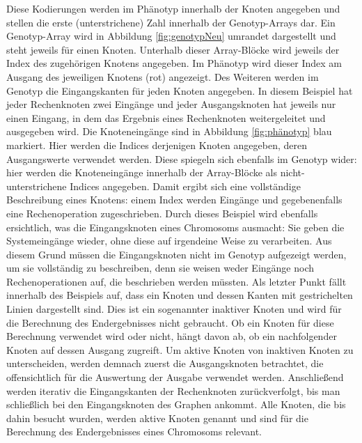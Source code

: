 Diese Kodierungen werden im Phänotyp innerhalb der Knoten angegeben und stellen die erste (unterstrichene) Zahl innerhalb der Genotyp-Arrays dar.
Ein Genotyp-Array wird in Abbildung \ref{fig:genotypNeu} umrandet dargestellt und steht jeweils für einen Knoten.
Unterhalb dieser Array-Blöcke wird jeweils der Index des zugehörigen Knotens angegeben.
Im Phänotyp wird dieser Index am Ausgang des jeweiligen Knotens (rot) angezeigt.\newline
Des Weiteren werden im Genotyp die Eingangskanten für jeden Knoten angegeben. 
In diesem Beispiel hat jeder Rechenknoten zwei Eingänge und jeder Ausgangsknoten hat jeweils nur einen Eingang, in dem das Ergebnis eines Rechenknoten weitergeleitet und ausgegeben wird.
Die Knoteneingänge sind in Abbildung \ref{fig:phänotyp} blau markiert.
Hier werden die Indices derjenigen Knoten angegeben, deren Ausgangswerte verwendet werden.
Diese spiegeln sich ebenfalls im Genotyp wider: hier werden die Knoteneingänge innerhalb der Array-Blöcke als nicht-unterstrichene Indices angegeben.
Damit ergibt sich eine vollständige Beschreibung eines Knotens: einem Index werden Eingänge und gegebenenfalls eine Rechenoperation zugeschrieben.\newline
Durch dieses Beispiel wird ebenfalls ersichtlich, was die Eingangsknoten eines Chromosoms ausmacht:
Sie geben die Systemeingänge wieder, ohne diese auf irgendeine Weise zu verarbeiten.
Aus diesem Grund müssen die Eingangsknoten nicht im Genotyp aufgezeigt werden, um sie vollständig zu beschreiben, denn sie weisen weder Eingänge noch Rechenoperationen auf, die beschrieben werden müssten.\newline
Als letzter Punkt fällt innerhalb des Beispiels auf, dass ein Knoten und dessen Kanten mit gestrichelten Linien dargestellt sind.
Dies ist ein sogenannter inaktiver Knoten und wird für die Berechnung des Endergebnisses nicht gebraucht.
Ob ein Knoten für diese Berechnung verwendet wird oder nicht, hängt davon ab, ob ein nachfolgender Knoten auf dessen Ausgang zugreift.
Um aktive Knoten von inaktiven Knoten zu unterscheiden, werden demnach zuerst die Ausgangsknoten betrachtet, die offensichtlich für die Auswertung der Ausgabe verwendet werden.
Anschließend werden iterativ die Eingangskanten der Rechenknoten zurückverfolgt, bis man schließlich bei den Eingangsknoten des Graphen ankommt.
Alle Knoten, die bis dahin besucht wurden, werden aktive Knoten genannt und sind für die Berechnung des Endergebnisses eines Chromosoms relevant. \\

